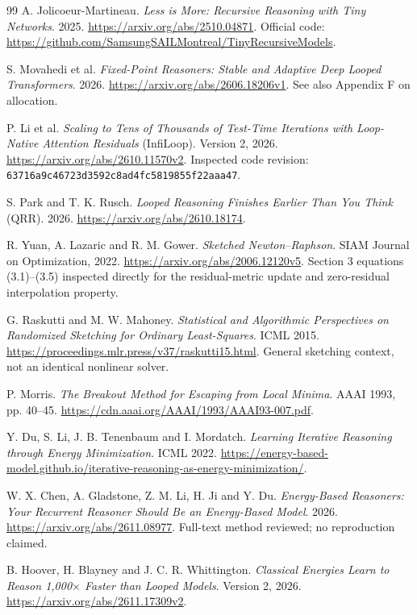 \documentclass[11pt,a4paper]{article}
\newcommand{\code}[1]{\nolinkurl{#1}}
\newcommand{\newtopic}{\clearpage}
\begin{document}
\newtopic
\begin{thebibliography}{99}
\small
{}A. Jolicoeur-Martineau. \emph{Less is More: Recursive Reasoning with Tiny Networks}. 2025. \url{https://arxiv.org/abs/2510.04871}. Official code: \url{https://github.com/SamsungSAILMontreal/TinyRecursiveModels}.

S. Movahedi et al. \emph{Fixed-Point Reasoners: Stable and Adaptive Deep Looped Transformers}. 2026. \url{https://arxiv.org/abs/2606.18206v1}. See also Appendix F on allocation.

 P. Li et al. \emph{Scaling to Tens of Thousands of Test-Time Iterations with Loop-Native Attention Residuals} (InfiLoop). Version 2, 2026. \url{https://arxiv.org/abs/2610.11570v2}. Inspected code revision: \code{63716a9c46723d3592c8ad4fc5819855f22aaa47}.

 S. Park and T. K. Rusch. \emph{Looped Reasoning Finishes Earlier Than You Think} (QRR). 2026. \url{https://arxiv.org/abs/2610.18174}.

 R. Yuan, A. Lazaric and R. M. Gower. \emph{Sketched Newton--Raphson}. SIAM Journal on Optimization, 2022. \url{https://arxiv.org/abs/2006.12120v5}. Section 3 equations (3.1)--(3.5) inspected directly for the residual-metric update and zero-residual interpolation property.

 G. Raskutti and M. W. Mahoney. \emph{Statistical and Algorithmic Perspectives on Randomized Sketching for Ordinary Least-Squares}. ICML 2015. \url{https://proceedings.mlr.press/v37/raskutti15.html}. General sketching context, not an identical nonlinear solver.

 P. Morris. \emph{The Breakout Method for Escaping from Local Minima}. AAAI 1993, pp. 40--45. \url{https://cdn.aaai.org/AAAI/1993/AAAI93-007.pdf}.

 Y. Du, S. Li, J. B. Tenenbaum and I. Mordatch. \emph{Learning Iterative Reasoning through Energy Minimization}. ICML 2022. \url{https://energy-based-model.github.io/iterative-reasoning-as-energy-minimization/}.

 W. X. Chen, A. Gladstone, Z. M. Li, H. Ji and Y. Du. \emph{Energy-Based Reasoners: Your Recurrent Reasoner Should Be an Energy-Based Model}. 2026. \url{https://arxiv.org/abs/2611.08977}. Full-text method reviewed; no reproduction claimed.

 B. Hoover, H. Blayney and J. C. R. Whittington. \emph{Classical Energies Learn to Reason 1,000$\times$ Faster than Looped Models}. Version 2, 2026. \url{https://arxiv.org/abs/2611.17309v2}.


\end{thebibliography}
\end{document}

